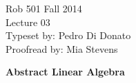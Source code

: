 \documentclass[letterpaper]{article}
\begin{document}
\baselineskip=48pt  %


\setlength{\parskip}{.3in}
\setlength{\itemsep}{.3in}

\pagestyle{plain}

{\Large \bf
\begin{center}
Rob 501 Fall 2014\\
Lecture 03\\
Typeset by:  Pedro Di Donato\\
Proofread by: Mia Stevens
\end{center}
}

\Large

\begin{center}
\textbf{Abstract Linear Algebra}
\end{center}
\end{document}

